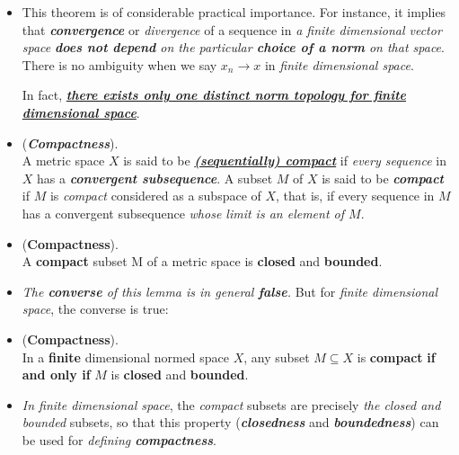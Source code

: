 \documentclass[11pt]{article}
\begin{document}
\begin{itemize}
\item \begin{remark}
This theorem is of considerable practical importance. For instance, it implies that \emph{\textbf{convergence}} or \emph{divergence} of a sequence in \emph{a finite dimensional vector space} \emph{\textbf{does not depend} on the particular \textbf{choice of a norm} on that space}. There is no ambiguity when we say $x_n \rightarrow x$ in \emph{finite dimensional space}.

In fact, \underline{\emph{\textbf{there exists only one distinct norm topology for finite dimensional space}}}. 
\end{remark}

\item \begin{definition} (\emph{\textbf{Compactness}}). \\
A metric space $X$ is said to be \underline{\emph{\textbf{(sequentially) compact}}} if \emph{every sequence} in $X$ has a \emph{\textbf{convergent subsequence}}. A subset $M$ of $X$ is said to be \emph{\textbf{compact}} if $M$ is \emph{compact} considered as a subspace of $X$, that is, if every sequence in $M$ has a convergent subsequence \emph{whose limit is an element of $M$}.
\end{definition}

\item \begin{lemma} (\textbf{Compactness}). \\
A \textbf{compact} subset M of a metric space is \textbf{closed} and \textbf{bounded}.
\end{lemma}

\item \begin{remark}
\emph{The \textbf{converse} of this lemma is in general \textbf{false}.} But for \emph{finite dimensional space}, the converse is true:
\end{remark}

\item \begin{theorem} (\textbf{Compactness}). \citep{kreyszig1989introductory}\\
In a \textbf{finite} dimensional normed space $X$, any subset $M \subseteq X$ is \textbf{compact} \textbf{if and only if} $M$ is \textbf{closed} and \textbf{bounded}.
\end{theorem}

\item \begin{remark}
\emph{In finite dimensional space}, the \emph{compact} subsets are precisely \emph{the closed and bounded} subsets, so that this property (\emph{\textbf{closedness}} and \emph{\textbf{boundedness}}) can be used for \emph{defining \textbf{compactness}}. 


\end{remark}
\end{itemize}
\end{document}
